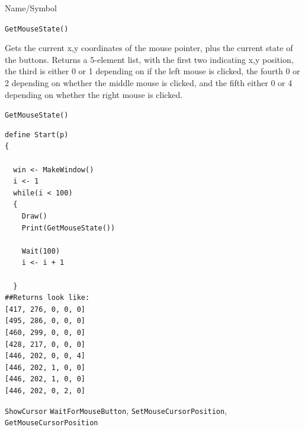 \begin{desc}{Name/Symbol}
\item[Name/Symbol] \verb+GetMouseState()+

\item[Description] Gets the current x,y coordinates of the mouse
  pointer, plus the current state of the buttons.  Returns a 5-element list, with the first two indicating x,y position, the third is either 0 or 1 depending on if the left mouse is clicked, the fourth 0 or 2 depending on whether the middle mouse is clicked, and the fifth either 0 or 4 depending on whether the right mouse is clicked.

\item[Usage]
\verb+GetMouseState()+

\item[Example]	

\begin{verbatim}
define Start(p)
{
 
  win <- MakeWindow()
  i <- 1
  while(i < 100)
  {
    Draw()
    Print(GetMouseState())

    Wait(100)
    i <- i + 1

  }	
##Returns look like:
[417, 276, 0, 0, 0]
[495, 286, 0, 0, 0]
[460, 299, 0, 0, 0]
[428, 217, 0, 0, 0]
[446, 202, 0, 0, 4]
[446, 202, 1, 0, 0]
[446, 202, 1, 0, 0]
[446, 202, 0, 2, 0]

\end{verbatim}

\item[See Also]
  \verb+ShowCursor+ \verb+WaitForMouseButton+,
  \verb+SetMouseCursorPosition+, \verb+GetMouseCursorPosition+
\end{desc}


